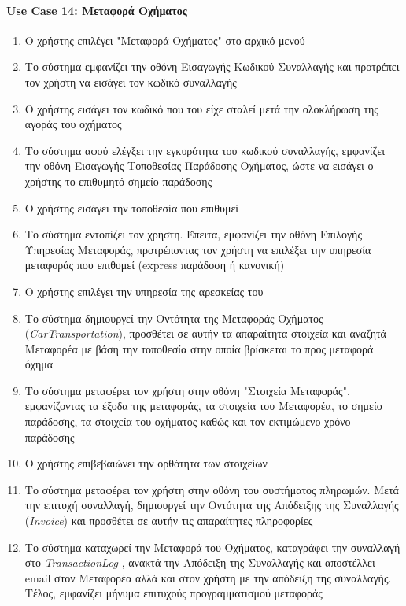 \documentclass{../ol-softwaremanual}
\begin{document}
	\newpage
	\centering
	
	\paragraph{\en Use Case 14: \gr Μεταφορά Οχήματος}  
	\begin{enumerate}
		\item Ο χρήστης επιλέγει \en"\gr Μεταφορά Οχήματος\en" \gr στο αρχικό μενού
		\item Το σύστημα εμφανίζει την οθόνη Εισαγωγής Κωδικού Συναλλαγής και προτρέπει τον χρήστη να εισάγει τον κωδικό συναλλαγής
		\item Ο χρήστης εισάγει τον κωδικό που του είχε σταλεί μετά την ολοκλήρωση της αγοράς του οχήματος
		\item Το σύστημα αφού ελέγξει την εγκυρότητα του κωδικού συναλλαγής, εμφανίζει την οθόνη Εισαγωγής Τοποθεσίας Παράδοσης Οχήματος, ώστε να εισάγει ο χρήστης το επιθυμητό σημείο παράδοσης
		\item Ο χρήστης εισάγει την τοποθεσία που επιθυμεί
		\item Το σύστημα εντοπίζει τον χρήστη. Έπειτα, εμφανίζει την οθόνη Επιλογής Υπηρεσίας Μεταφοράς, προτρέποντας τον χρήστη να επιλέξει την υπηρεσία μεταφοράς που επιθυμεί (\en express \gr παράδοση ή κανονική)		
		\item Ο χρήστης επιλέγει την υπηρεσία της αρεσκείας του
		\item Το σύστημα δημιουργεί την Οντότητα της Μεταφοράς Οχήματος (\en\textit{CarTransportation}\gr), προσθέτει σε αυτήν τα απαραίτητα στοιχεία και αναζητά Μεταφορέα με βάση την τοποθεσία στην οποία βρίσκεται το προς μεταφορά όχημα				
		\item Το σύστημα μεταφέρει τον χρήστη στην οθόνη \en"\gr Στοιχεία Μεταφοράς\en"\gr, εμφανίζοντας τα έξοδα της μεταφοράς, τα στοιχεία του Μεταφορέα, το σημείο παράδοσης, τα στοιχεία του οχήματος καθώς και τον εκτιμώμενο χρόνο παράδοσης 
		\item Ο χρήστης επιβεβαιώνει την ορθότητα των στοιχείων 		
		\item Το σύστημα μεταφέρει τον χρήστη στην οθόνη του συστήματος πληρωμών. Μετά την επιτυχή συναλλαγή, δημιουργεί την Οντότητα της Απόδειξης της Συναλλαγής (\en \textit{Invoice}\gr) και προσθέτει σε αυτήν τις απαραίτητες πληροφορίες  
		\item Το σύστημα καταχωρεί την Μεταφορά του Οχήματος, καταγράφει την συναλλαγή στο \en \textit{TransactionLog} \gr, ανακτά την Απόδειξη της Συναλλαγής και αποστέλλει \en email \gr στον Μεταφορέα αλλά και στον χρήστη με την απόδειξη της συναλλαγής. Τέλος, εμφανίζει μήνυμα επιτυχούς προγραμματισμού μεταφοράς
	\end{enumerate}
	
\end{document}
